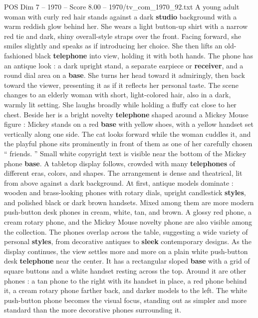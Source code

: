 \begin{textsample}{POS Dim 7 – 1970 – Score 8.00 – 1970/tv\_com\_1970\_92.txt}  \label{ex:f7_pos_033}
A young adult woman with curly red hair stands against a dark \textbf{studio} background with a warm reddish glow behind her.
She wears a light button-up shirt with a narrow red tie and dark, shiny overall-style straps over the front.
Facing forward, she smiles slightly and speaks as if introducing her choice.
She then lifts an old-fashioned black \textbf{telephone} into view, holding it with both hands.
The phone has an antique look : a dark upright stand, a separate earpiece or \textbf{receiver}, and a round dial area on a \textbf{base}.
She turns her head toward it admiringly, then back toward the viewer, presenting it as if it reflects her personal taste.
The scene changes to an elderly woman with short, light-colored hair, also in a dark, warmly lit setting.
She laughs broadly while holding a fluffy cat close to her chest.
Beside her is a bright novelty \textbf{telephone} shaped around a Mickey Mouse figure : Mickey stands on a red \textbf{base} with yellow shoes, with a yellow handset set vertically along one side.
The cat looks forward while the woman cuddles it, and the playful phone sits prominently in front of them as one of her carefully chosen “ friends. ” Small white copyright text is visible near the bottom of the Mickey phone \textbf{base}.
A tabletop display follows, crowded with many \textbf{telephones} of different eras, colors, and shapes.
The arrangement is dense and theatrical, lit from above against a dark background.
At first, antique models dominate : wooden and brass-looking phones with rotary dials, upright candlestick \textbf{styles}, and polished black or dark brown handsets.
Mixed among them are more modern push-button desk phones in cream, white, tan, and brown.
A glossy red phone, a cream rotary phone, and the Mickey Mouse novelty phone are also visible among the collection.
The phones overlap across the table, suggesting a wide variety of personal \textbf{styles}, from decorative antiques to \textbf{sleek} contemporary designs.
As the display continues, the view settles more and more on a plain white push-button desk \textbf{telephone} near the center.
It has a rectangular sloped \textbf{base} with a grid of square buttons and a white handset resting across the top.
Around it are other phones : a tan phone to the right with its handset in place, a red phone behind it, a cream rotary phone farther back, and darker models to the left.
The white push-button phone becomes the visual focus, standing out as simpler and more standard than the more decorative phones surrounding it.

\end{textsample}
